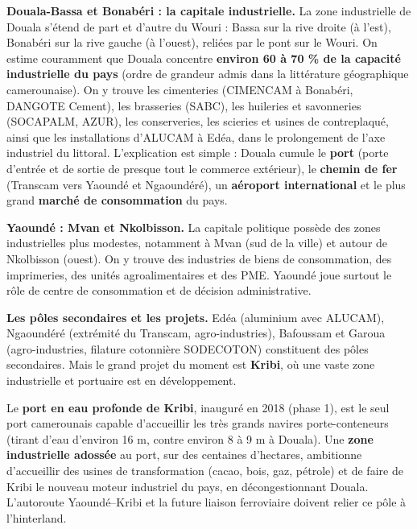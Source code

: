 \documentclass[11pt]{article}
\begin{document}
\textbf{Douala-Bassa et Bonabéri : la capitale industrielle.} La zone industrielle de Douala s'étend de part et d'autre du Wouri : Bassa sur la rive droite (à l'est), Bonabéri sur la rive gauche (à l'ouest), reliées par le pont sur le Wouri. On estime couramment que Douala concentre \textbf{environ 60 à 70 \% de la capacité industrielle du pays} (ordre de grandeur admis dans la littérature géographique camerounaise). On y trouve les cimenteries (CIMENCAM à Bonabéri, DANGOTE Cement), les brasseries (SABC), les huileries et savonneries (SOCAPALM, AZUR), les conserveries, les scieries et usines de contreplaqué, ainsi que les installations d'ALUCAM à Edéa, dans le prolongement de l'axe industriel du littoral. L'explication est simple : Douala cumule le \textbf{port} (porte d'entrée et de sortie de presque tout le commerce extérieur), le \textbf{chemin de fer} (Transcam vers Yaoundé et Ngaoundéré), un \textbf{aéroport international} et le plus grand \textbf{marché de consommation} du pays.

\textbf{Yaoundé : Mvan et Nkolbisson.} La capitale politique possède des zones industrielles plus modestes, notamment à Mvan (sud de la ville) et autour de Nkolbisson (ouest). On y trouve des industries de biens de consommation, des imprimeries, des unités agroalimentaires et des PME. Yaoundé joue surtout le rôle de centre de consommation et de décision administrative.

\textbf{Les pôles secondaires et les projets.} Edéa (aluminium avec ALUCAM), Ngaoundéré (extrémité du Transcam, agro-industries), Bafoussam et Garoua (agro-industries, filature cotonnière SODECOTON) constituent des pôles secondaires. Mais le grand projet du moment est \textbf{Kribi}, où une vaste zone industrielle et portuaire est en développement.

\begin{savaistu}
Le \textbf{port en eau profonde de Kribi}, inauguré en 2018 (phase 1), est le seul port camerounais capable d'accueillir les très grands navires porte-conteneurs (tirant d'eau d'environ 16 m, contre environ 8 à 9 m à Douala). Une \textbf{zone industrielle adossée} au port, sur des centaines d'hectares, ambitionne d'accueillir des usines de transformation (cacao, bois, gaz, pétrole) et de faire de Kribi le nouveau moteur industriel du pays, en décongestionnant Douala. L'autoroute Yaoundé--Kribi et la future liaison ferroviaire doivent relier ce pôle à l'hinterland.
\end{savaistu}
\end{document}
